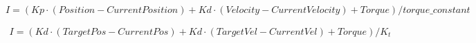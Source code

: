 \documentclass{article}
\begin{document}
\[I = (Kp \cdot (Position - CurrentPosition) + Kd \cdot (Velocity - CurrentVelocity) + Torque) / torque\_constant
\]
\pagebreak

\begin{eqnarray*}    I=(Kd \cdot (TargetPos-CurrentPos)+Kd \cdot (TargetVel-CurrentVel)+Torque)/K_t
\end{eqnarray*}
\pagebreak
\end{document}
